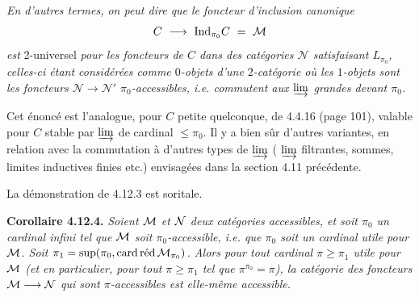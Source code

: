 
\textit{En d'autres termes, on peut dire que le foncteur d'inclusion canonique}
\[
C \ \longrightarrow \ \Ind_{\pi_0} C \ = \ \mathcal{M}
\]
\textit{est} 2-universel \textit{pour les foncteurs de $C$ dans des catégories $\mathcal{N}$ satisfaisant $L_{\pi_0}$, celles-ci étant considérées comme $0$-objets d'une $2$-catégorie où les $1$-objets sont les foncteurs $\mathcal{N} \longrightarrow \mathcal{N}'$ $\pi_0$-accessibles, i.e. commutent aux $\varinjlim$ grandes devant $\pi_0$.}

Cet énoncé est l'analogue, pour $C$ petite quelconque, de 4.4.16 (page 101), valable pour $C$ stable par $\varinjlim$ de cardinal $\leqslant \pi_0$. Il y a bien sûr d'autres variantes, en relation avec la commutation à d'autres types de $\varinjlim$ ( $\varinjlim$ filtrantes, sommes, limites inductives finies etc.) envisagées dans la section 4.11 précédente.

La démonstration de 4.12.3 est soritale.

\textbf{Corollaire 4.12.4.} \textit{Soient $\M$ et $\N$ deux catégories accessibles, et soit $\pi_0$ un cardinal infini tel que $\M$ soit $\pi_0$-accessible, i.e. que $\pi_0$ soit un cardinal utile pour $\M$. Soit $\pi_1 = \sup(\pi_0,\allowbreak \card\red\M_{\pi_0})$. Alors pour tout cardinal $\pi \geqslant \pi_1$ utile pour $\M$ (et en particulier, pour tout $\pi \geqslant \pi_1$ tel que $\pi^{\pi_0} = \pi$), la catégorie des foncteurs $\M \longrightarrow \N$ qui sont $\pi$-accessibles est elle-même accessible.}

